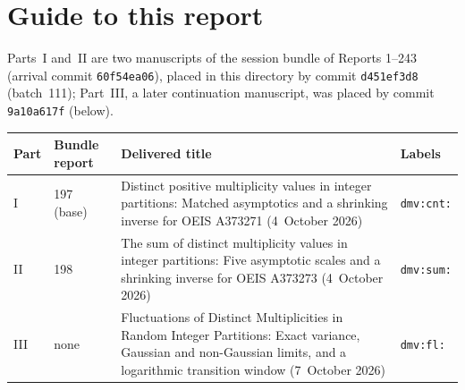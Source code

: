 \documentclass[11pt,letterpaper]{article}
\numberwithin{equation}{section}
\theoremstyle{definition}\newtheorem{definition}[theorem]{Definition}
\theoremstyle{remark}\newtheorem{remark}[theorem]{Remark}
\newcommand{\file}[1]{\nolinkurl{#1}}
\begin{document}
\section*{Guide to this report}\label{dmv:sec:guide}
Parts~I and~II are two manuscripts of the session bundle of Reports 1--243
(arrival commit \file{60f54ea06}), placed in this directory by commit
\file{d451ef3d8} (batch~111); Part~III, a later continuation manuscript, was
placed by commit \file{9a10a617f} (below).
\begin{center}
\small
\begin{tabular}{@{}l l >{\raggedright\arraybackslash}p{} l@{}}
\toprule
Part & Bundle report & Delivered title & Labels\\
\midrule
I & 197 (base) & Distinct positive multiplicity values in integer partitions: Matched asymptotics and a shrinking inverse for OEIS A373271 (4~October 2026) & \file{dmv:cnt:}\\
II & 198 & The sum of distinct multiplicity values in integer partitions: Five asymptotic scales and a shrinking inverse for OEIS A373273 (4~October 2026) & \file{dmv:sum:}\\
III & none & Fluctuations of Distinct Multiplicities in Random Integer Partitions: Exact variance, Gaussian and non-Gaussian limits, and a logarithmic transition window (7~October 2026) & \file{dmv:fl:}\\
\bottomrule
\end{tabular}
\end{center}
\end{document}
